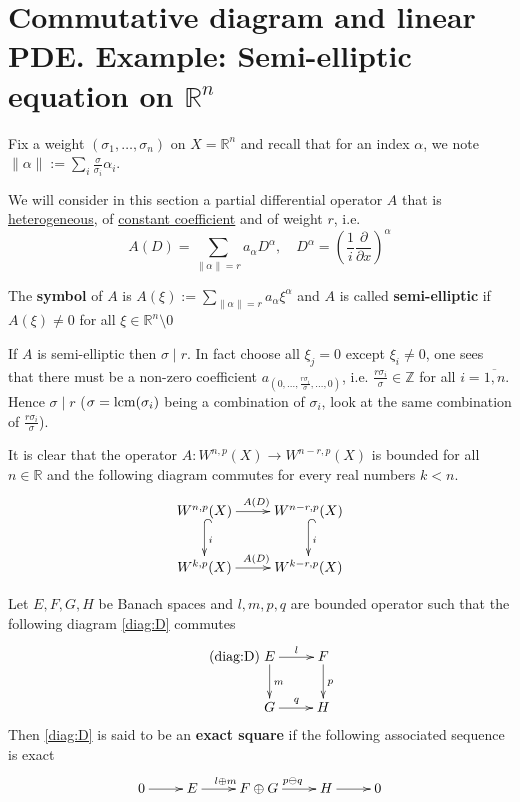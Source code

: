 \section{Commutative diagram and linear PDE. Example: Semi-elliptic equation on \(\mathbb{R}^n\)}
\label{sec:org2267616}
Fix a weight \((\sigma_1,\dots,\sigma_n)\) on \(X = \mathbb{R}^n\) and recall that
for an index \(\alpha\), we note \(\|\alpha\| := \sum_i \frac{\sigma}{\sigma_i}\alpha_i\).

We will consider in this section a partial differential operator \(A\) that is
\uline{heterogeneous}, of \uline{constant coefficient} and of weight \(r\), i.e.
\[
 A(D) = \sum_{\|\alpha\|=r} a_\alpha D^\alpha,\quad D^\alpha = \left(\frac{1}{i}
\frac{\partial}{\partial x}\right)^\alpha
\]


The \textbf{symbol} of \(A\) is \(A(\xi):= \sum_{\|\alpha\| = r} a_\alpha\xi^\alpha\) and \(A\) is
called \textbf{semi-elliptic} if \(A(\xi) \ne 0\) for all \(\xi\in \mathbb{R}^n\setminus 0\)

\begin{remark}
If \(A\) is semi-elliptic then \(\sigma \mid r\). In fact choose all \(\xi_j = 0\)
except \(\xi_i\ne 0\), one sees that there must be a non-zero coefficient \(a_{(0,\dots, \frac{r\sigma_i}{\sigma},\dots, 0)}\), i.e. \(\frac{r\sigma_i}{\sigma}\in
\mathbb{Z}\) for all \(i=\overline{1,n}\). Hence \(\sigma \mid r\) (\(\sigma= \mathop{\rm lcm}\nolimits
(\sigma_i)\) being a combination of \(\sigma_i\), look at the same combination of \(\frac{r\sigma_i}{\sigma}\)).
\end{remark}

It is clear that the operator \(A: W^{n,p}(X) \longrightarrow W^{n-r,p}(X)\) is bounded
for all \(n\in \mathbb{R}\) and the following diagram commutes for every real numbers \(k < n\).
\begin{equation}
\label{diag:elliptic}
\xymatrix{
W^{n,p}(X) \ar@{->}[r]^{A(D)} \ar@{^{(}->}[d]^{i} & W^{n-r,p}(X) \ar@{^{(}->}[d]^{i} \\
W^{k,p}(X) \ar@{->}[r]^{A(D)} & W^{k-r,p}(X)
}
\end{equation}

\begin{definition}
Let \(E,F,G,H\) be Banach spaces and \(l,m,p,q\) are bounded operator such that the
following diagram \eqref{diag:D} commutes
\begin{equation}
\label{diag:D}
\tag{diag:D}
\xymatrix{
E \ar@{->}[r]^{l} \ar@{->}[d]^{m} & F \ar@{->}[d]^{p} \\
G \ar@{->}[r]^{q} & H
}
\end{equation}
Then \eqref{diag:D} is said to be an \textbf{exact square} if the following associated sequence is exact
\[
 \xymatrix{
0 \ar@{->}[r] & E \ar@{->}[r]^{l\oplus m} & F\oplus G \ar@{->}[r]^{p\ominus q} & H \ar@{->}[r] & 0
}
\]
\end{definition}


